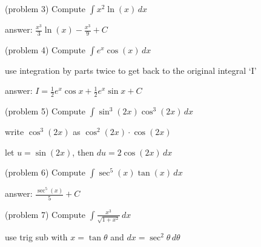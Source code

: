 \documentclass[handout]{ximera}
\begin{document}
\begin{problem}(problem 3)
Compute $\displaystyle \int x^2\ln(x) \, dx$

\begin{hint}
answer: $\displaystyle \frac{x^3}{3} \ln(x) - \frac{x^3}{9} + C$
\end{hint}


\end{problem}


\begin{problem}(problem 4)
Compute $\displaystyle \int e^x \cos(x) \, dx$

\begin{hint}
use integration by parts twice to get back to the original integral `I'
\end{hint}

\begin{hint}
answer: $I = \frac12 e^x \cos x + \frac12 e^x \sin x + C$
\end{hint}

\end{problem}

\begin{problem}(problem 5)
Compute $\displaystyle \int \sin^3(2x) \cos^3(2x) \, dx$

\begin{hint}
write $\cos^3(2x)$ as $\cos^2(2x) \cdot \cos(2x)$
\end{hint}

\begin{hint}
let $u = \sin(2x)$, then $du = 2\cos(2x) \, dx$
\end{hint}

\end{problem}

\begin{problem}(problem 6)
Compute $\displaystyle \int \sec^5(x) \tan(x)  \, dx$

\begin{hint}
answer: $\displaystyle \frac{\sec^5(x)}{5} + C$
\end{hint}

\end{problem}

\begin{problem}(problem 7)
Compute $\displaystyle \int \frac{x^3}{ \sqrt{1+x^2}} \, dx$

\begin{hint}
use trig sub with $x = \tan \theta$ and $dx =  \sec^2 \theta \, d\theta$
\end{hint}

\end{problem}
\end{document}

